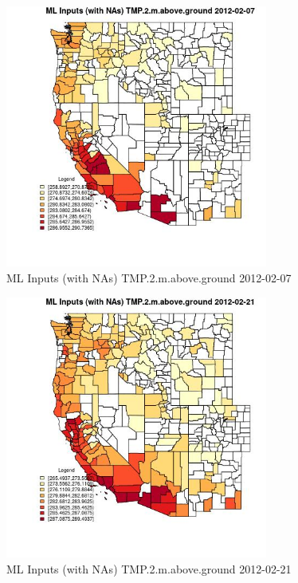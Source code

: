 \begin{figure} 
\centering  
\includegraphics[width=0.77\textwidth]{Code_Outputs/Report_ML_input_PM25_Step4_part_f_de_duplicated_aves_prioritize_24hr_obswNAs_CountyTMP2mabovegroundMean2012-02-07.jpg} 
\caption{\label{fig:Report_ML_input_PM25_Step4_part_f_de_duplicated_aves_prioritize_24hr_obswNAsCountyTMP2mabovegroundMean2012-02-07}ML Inputs (with NAs) TMP.2.m.above.ground 2012-02-07} 
\end{figure} 
 

\begin{figure} 
\centering  
\includegraphics[width=0.77\textwidth]{Code_Outputs/Report_ML_input_PM25_Step4_part_f_de_duplicated_aves_prioritize_24hr_obswNAs_CountyTMP2mabovegroundMean2012-02-21.jpg} 
\caption{\label{fig:Report_ML_input_PM25_Step4_part_f_de_duplicated_aves_prioritize_24hr_obswNAsCountyTMP2mabovegroundMean2012-02-21}ML Inputs (with NAs) TMP.2.m.above.ground 2012-02-21} 
\end{figure} 
 

